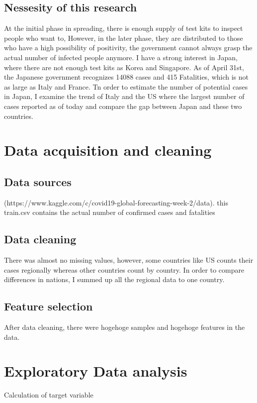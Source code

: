 \documentclass{article}
\begin{document}
\subsection{Nessesity of this research}
At the initial phase in spreading, there is enough supply of test kits to inspect people who want to, However, in the later phase, they are distributed to those who have a high possibility of positivity, the government cannot always grasp the actual number of infected people anymore. I have a strong interest in Japan, where there are not enough test kits as Korea and Singapore.
As of April 31st, the Japanese government recognizes 14088 cases and 415 Fatalities, which is not as large as Italy and France. Tn order to estimate the number of potential cases in Japan, I examine the trend of Italy and the US where the largest number of cases reported as of today and compare the gap between Japan and these two countries.

\section{Data acquisition and cleaning}
\subsection{Data sources}

(https://www.kaggle.com/c/covid19-global-forecasting-week-2/data).
this train.csv contains the actual number of confirmed cases and fatalities

\subsection{Data cleaning}
There was almost no missing values, however, some countries like US  counts their cases regionally whereas other countries count by country. In order to compare differences in nations, I summed up all the regional data to one country.

\subsection{Feature selection}
After data cleaning, there were hogehoge samples and hogehoge features in the data. 
\section{Exploratory Data analysis}

Calculation of target variable
\end{document}
